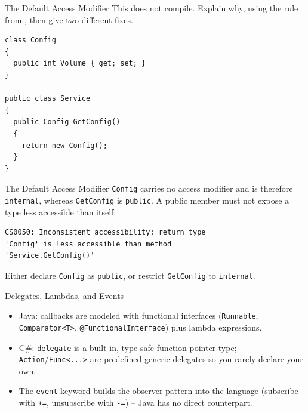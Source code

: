\begin{exerciseframe}{The Default Access Modifier}
  This does not compile. Explain why, using the rule from
  ,
  then give two different fixes.
  \vspace{1ex}

  \begin{lstlisting}[basicstyle=\scriptsize\ttfamily]
class Config
{
  public int Volume { get; set; }
}

public class Service
{
  public Config GetConfig()
  {
    return new Config();
  }
}
  \end{lstlisting}
\end{exerciseframe}

\begin{solutionframe}{The Default Access Modifier}
  \texttt{Config} carries no access modifier and is therefore
  \texttt{internal}, whereas \texttt{GetConfig} is \texttt{public}. A public
  member must not expose a type less accessible than itself:
  \vspace{1ex}

  \begin{lstlisting}[language={},basicstyle=\scriptsize\ttfamily]
CS0050: Inconsistent accessibility: return type
'Config' is less accessible than method
'Service.GetConfig()'
  \end{lstlisting}
  Either declare \texttt{Config} as \texttt{public}, or restrict
  \texttt{GetConfig} to \texttt{internal}.
  \vspace{4ex}

\end{solutionframe}

\begin{frame}{Delegates, Lambdas, and Events}
  \begin{itemize}
    \item Java: callbacks are modeled with functional interfaces
      (\texttt{Runnable}, \texttt{Comparator<T>}, \texttt{@FunctionalInterface})
      plus lambda expressions.
    \item C\#: \texttt{delegate} is a built-in, type-safe function-pointer
      type; \texttt{Action}/\texttt{Func<...>} are predefined generic
      delegates so you rarely declare your own.
    \item The \texttt{event} keyword builds the observer pattern into the
      language (subscribe with \texttt{+=}, unsubscribe with \texttt{-=}) --
      Java has no direct counterpart.
  \end{itemize}
\end{frame}

